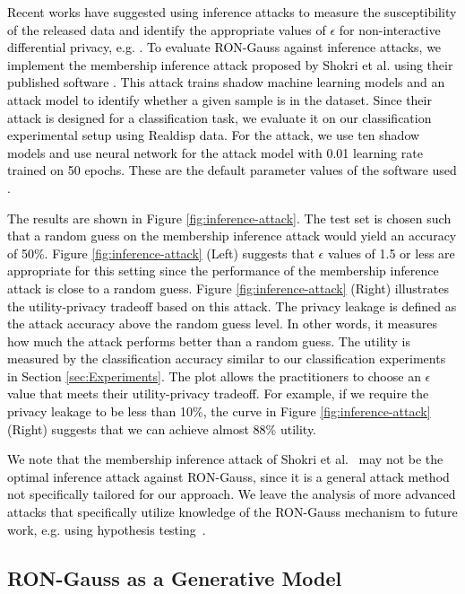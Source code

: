 \documentclass[USenglish,oneside,twocolumn]{article}
\theoremstyle{definition}
\theoremstyle{remark}
\theoremstyle{plain}
\theoremstyle{plain}
\newcommand{\chang}{\textcolor{black}}
\begin{document}
\chang{Recent works have suggested using inference attacks to measure the susceptibility of the released data and identify the appropriate values of $\epsilon$ for non-interactive differential privacy, e.g. \cite{RefWorks:542,balu2014challenging}. To evaluate RON-Gauss against inference attacks, we implement the membership inference attack proposed by Shokri et al. \cite{RefWorks:542} using their published software \cite{membership-att}. This attack trains shadow machine learning models and an attack model to identify whether a given sample is in the dataset. Since their attack is designed for a classification task, we evaluate it on our classification experimental setup using Realdisp data. For the attack, we use ten shadow models and use neural network for the attack model with 0.01 learning rate trained on 50 epochs. These are the default parameter values of the software used \cite{membership-att}.}

\chang{The results are shown in Figure \ref{fig:inference-attack}. The test set is chosen such that a random guess on the membership inference attack would yield an accuracy of 50\%. Figure \ref{fig:inference-attack} (Left) suggests that $\epsilon$ values of 1.5 or less are appropriate for this setting since the performance of the membership inference attack is close to a random guess. Figure \ref{fig:inference-attack} (Right) illustrates the utility-privacy tradeoff based on this attack. The privacy leakage is defined as the attack accuracy above the random guess level. In other words, it measures how much the attack performs better than a random guess. The utility is measured by the classification accuracy similar to our classification experiments in Section \ref{sec:Experiments}. The plot allows the practitioners to choose an $\epsilon$ value that meets their utility-privacy tradeoff. For example, if we require the privacy leakage to be less than 10\%, the curve in Figure \ref{fig:inference-attack} (Right) suggests that we can achieve almost 88\% utility.
}

\chang{We note that the membership inference attack of Shokri et al.~\cite{RefWorks:542} may not be the optimal inference attack against RON-Gauss, since it is a general attack method not specifically tailored for our approach. We leave the analysis of more advanced attacks that specifically utilize knowledge of the RON-Gauss mechanism to future work,   e.g. using hypothesis testing~\cite{balu2014challenging}.}

\vspace{-1em}
\subsection{RON-Gauss as a Generative Model}
\end{document}
